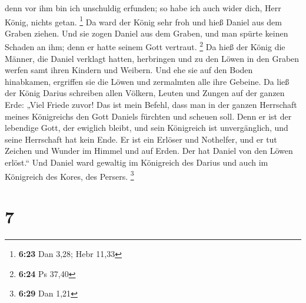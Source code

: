 denn vor ihm bin ich unschuldig erfunden; so habe ich auch wider dich,
Herr König, nichts getan. \footnote{\textbf{6:23} Dan 3,28; Hebr 11,33}
 Da ward der König sehr froh und hieß Daniel aus dem Graben
ziehen. Und sie zogen Daniel aus dem Graben, und man spürte keinen
Schaden an ihm; denn er hatte seinem Gott vertraut. \footnote{\textbf{6:24}
  Ps 37,40}  Da hieß der König die Männer, die Daniel
verklagt hatten, herbringen und zu den Löwen in den Graben werfen samt
ihren Kindern und Weibern. Und ehe sie auf den Boden hinabkamen,
ergriffen sie die Löwen und zermalmten alle ihre Gebeine. 
Da ließ der König Darius schreiben allen Völkern, Leuten und Zungen auf
der ganzen Erde: „Viel Friede zuvor!  Das ist mein Befehl,
dass man in der ganzen Herrschaft meines Königreichs den Gott Daniels
fürchten und scheuen soll. Denn er ist der lebendige Gott, der ewiglich
bleibt, und sein Königreich ist unvergänglich, und seine Herrschaft hat
kein Ende.  Er ist ein Erlöser und Nothelfer, und er tut
Zeichen und Wunder im Himmel und auf Erden. Der hat Daniel von den Löwen
erlöst.``  Und Daniel ward gewaltig im Königreich des
Darius und auch im Königreich des Kores, des Persers. \footnote{\textbf{6:29}
  Dan 1,21}

\hypertarget{section-4}{%
\section{7}\label{section-4}}

